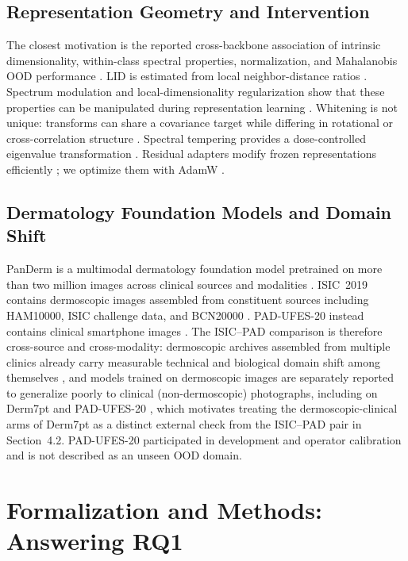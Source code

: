 \documentclass[pdflatex,sn-basic]{sn-jnl}
\theoremstyle{plain}
\theoremstyle{definition}
\theoremstyle{remark}
\begin{document}
\subsection{Representation Geometry and Intervention}
The closest motivation is the reported cross-backbone association of intrinsic dimensionality, within-class spectral properties, normalization, and Mahalanobis OOD performance \citep{janiak2025dissecting}. LID is estimated from local neighbor-distance ratios \citep{levina2004maximum}. Spectrum modulation and local-dimensionality regularization show that these properties can be manipulated during representation learning \citep{weng2024modulate,huang2024ldreg}. Whitening is not unique: transforms can share a covariance target while differing in rotational or cross-correlation structure \citep{kessy2018optimal}. Spectral tempering provides a dose-controlled eigenvalue transformation \citep{li2026spectral}. Residual adapters modify frozen representations efficiently \citep{rebuffi2017learning}; we optimize them with AdamW \citep{loshchilov2019decoupled}.

\subsection{Dermatology Foundation Models and Domain Shift}
PanDerm is a multimodal dermatology foundation model pretrained on more than two million images across clinical sources and modalities \citep{yan2025multimodal}. ISIC~2019 contains dermoscopic images assembled from constituent sources including HAM10000, ISIC challenge data, and BCN20000 \citep{tschandl2018ham10000,codella2018skin,hernandez2024bcn20000}. PAD-UFES-20 instead contains clinical smartphone images \citep{pacheco2020pad}. The ISIC--PAD comparison is therefore cross-source and cross-modality: dermoscopic archives assembled from multiple clinics already carry measurable technical and biological domain shift among themselves \citep{fogelberg2023domain}, and models trained on dermoscopic images are separately reported to generalize poorly to clinical (non-dermoscopic) photographs, including on Derm7pt and PAD-UFES-20 \citep{sultana2025selective}, which motivates treating the dermoscopic-clinical arms of Derm7pt as a distinct external check from the ISIC--PAD pair in Section~4.2. PAD-UFES-20 participated in development and operator calibration and is not described as an unseen OOD domain.

\section{Formalization and Methods: Answering RQ1}
\end{document}
